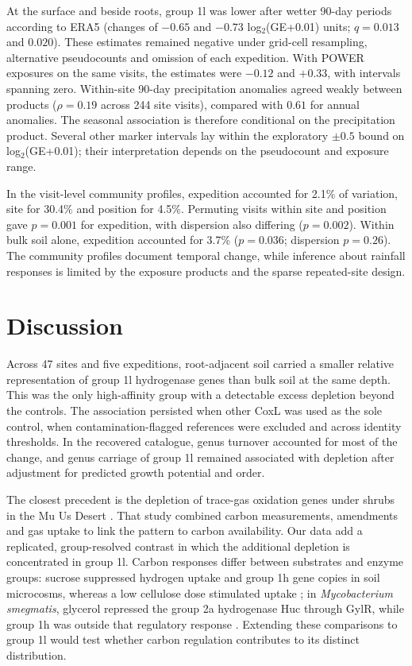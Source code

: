 \documentclass[11pt]{article}
\begin{document}
At the surface and beside roots, group 1l was lower after wetter 90-day periods according to ERA5
(changes of $-0.65$ and $-0.73$ log$_2$(GE+0.01) units; $q=0.013$ and $0.020$). These estimates
remained negative under grid-cell resampling, alternative pseudocounts and omission of each expedition.
With POWER exposures on the same visits, the estimates were $-0.12$ and $+0.33$, with intervals
spanning zero. Within-site 90-day precipitation anomalies agreed weakly between products
($\rho=0.19$ across 244 site visits), compared with $0.61$ for annual anomalies. The seasonal
association is therefore conditional on the precipitation product. Several other marker intervals
lay within the exploratory $\pm0.5$ bound on log$_2$(GE+0.01); their interpretation depends on the
pseudocount and exposure range.

In the visit-level community profiles, expedition accounted for 2.1\% of variation, site for 30.4\%
and position for 4.5\%. Permuting visits within site and position gave $p=0.001$ for expedition,
with dispersion also differing ($p=0.002$). Within bulk soil alone, expedition accounted for 3.7\%
($p=0.036$; dispersion $p=0.26$). The community profiles document temporal change, while inference
about rainfall responses is limited by the exposure products and the sparse repeated-site design.

\section*{Discussion}
Across 47 sites and five expeditions, root-adjacent soil carried a smaller relative representation of
group 1l hydrogenase genes than bulk soil at the same depth. This was the only high-affinity group with
a detectable excess depletion beyond the controls. The association persisted when other CoxL was used
as the sole control, when contamination-flagged references were excluded and across identity thresholds.
In the recovered catalogue, genus turnover accounted for most of the change, and genus carriage of
group 1l remained associated with depletion after adjustment for predicted growth potential and order.

The closest precedent is the depletion of trace-gas oxidation genes under shrubs in the Mu Us Desert
\citep{li2023fertile}. That study combined carbon measurements, amendments and gas uptake to link the
pattern to carbon availability. Our data add a replicated, group-resolved contrast in which the
additional depletion is concentrated in group 1l. Carbon responses differ between substrates and enzyme
groups: sucrose suppressed hydrogen uptake and group 1h gene copies in soil microcosms, whereas a low
cellulose dose stimulated uptake \citep{baril2023carbon}; in \textit{Mycobacterium smegmatis}, glycerol
repressed the group 2a hydrogenase Huc through GylR, while group 1h was outside that regulatory response
\citep{kropp2026glycerol}. Extending these comparisons to group 1l would test whether carbon regulation
contributes to its distinct distribution.
\end{document}
